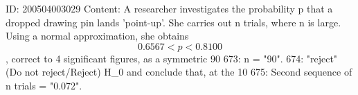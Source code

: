 \documentclass{article}
\begin{document}
ID: 200504003029
Content:
A researcher investigates the probability p that a dropped drawing pin lands 'point-up'. She carries out n trials, where n is large. Using a normal approximation, she obtains $$0.6567 < p < 0.8100$$, correct to 4 significant figures, as a symmetric 90%
673: n = "90".
674: "reject" (Do not reject/Reject) H_0 and conclude that, at the 10%
675: Second sequence of n trials = "0.072".
\end{document}
